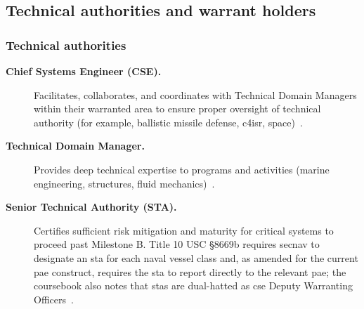 \documentclass[../main.tex]{subfiles}
\begin{document}
\subsection{Technical authorities and warrant holders}
\subsubsection{Technical authorities}
\begin{description}
  \item[\textbf{Chief Systems Engineer (CSE).}] Facilitates, collaborates, and coordinates with Technical Domain Managers within their warranted area to ensure proper oversight of technical authority (for example, ballistic missile defense, \ac{c4isr}, space)~\autocite{edo-2-1-5-technical-authority-2025}.
  \item[\textbf{Technical Domain Manager.}] Provides deep technical expertise to programs and activities (marine engineering, structures, fluid mechanics)~\autocite{edo-2-1-5-technical-authority-2025}.
  \item[\textbf{Senior Technical Authority (STA).}] Certifies sufficient risk mitigation and maturity for critical systems to proceed past Milestone B. Title 10 USC \S 8669b requires \ac{secnav} to designate an \ac{sta} for each naval vessel class and, as amended for the current \ac{pae} construct, requires the \ac{sta} to report directly to the relevant \ac{pae}; the coursebook also notes that \acp{sta} are dual-hatted as \ac{cse} Deputy Warranting Officers~\autocite{USC-10-8669b,edo-2-1-5-technical-authority-2025}.
\end{description}
\end{document}
